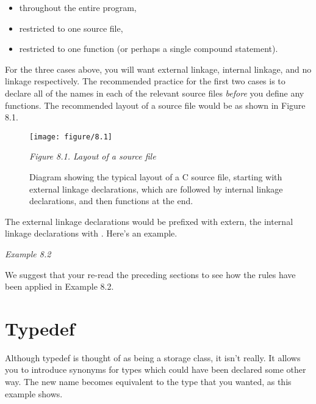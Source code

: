    \begin{itemize}
    \item throughout the entire program,

    \item restricted to one source file,

    \item restricted to one function (or perhaps a single compound
     statement).
   \end{itemize}

   For the three cases above, you will want external linkage, internal
    linkage, and no linkage respectively. The recommended practice for the
    first two cases is to declare all of the names in each of the relevant
    source files \textit{before} you define any functions. The recommended
    layout of a source file would be as shown in Figure 8.1.


    \begin{figure*}\centering
      \texttt{[image: figure/8.1]}
      \caption{Diagram showing the typical layout of a C source file, starting            with external linkage declarations, which are followed by internal            linkage declarations, and then functions at the end.}
\begin{center}\textit{Figure 8.1. Layout of a source file}\end{center}
    \end{figure*}



   The external linkage declarations would be prefixed with extern, the
    internal linkage declarations with \static. Here's an
    example.


    \begin{center}\textit{Example 8.2}\end{center}


   We suggest that your re-read the preceding sections to see how the
    rules have been applied in Example 8.2.


  

 
        \section{Typedef}
        

  

  Although typedef is thought of as being a storage class, it isn't
   really. It allows you to introduce synonyms for types which could have
   been declared some other way. The new name becomes equivalent to the type
   that you wanted, as this example shows.


